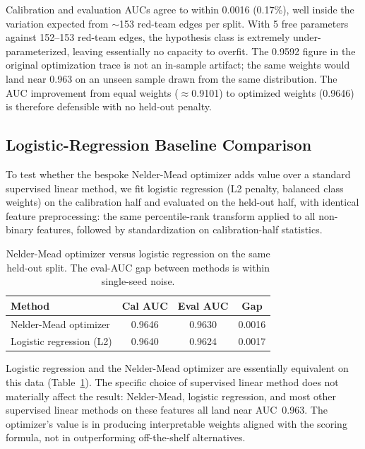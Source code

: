 Calibration and evaluation AUCs agree to within 0.0016 (0.17\%), well inside the variation expected from $\sim$153 red-team edges per split. With 5 free parameters against 152--153 red-team edges, the hypothesis class is extremely under-parameterized, leaving essentially no capacity to overfit. The 0.9592 figure in the original optimization trace is not an in-sample artifact; the same weights would land near 0.963 on an unseen sample drawn from the same distribution. The AUC improvement from equal weights ($\approx$0.9101) to optimized weights (0.9646) is therefore defensible with no held-out penalty.


\subsection{Logistic-Regression Baseline Comparison}
\label{sec:lr_baseline}

To test whether the bespoke Nelder-Mead optimizer adds value over a standard supervised linear method, we fit logistic regression (L2 penalty, balanced class weights) on the calibration half and evaluated on the held-out half, with identical feature preprocessing: the same percentile-rank transform applied to all non-binary features, followed by standardization on calibration-half statistics.

\begin{table}[h]
\centering
\begin{tabular}{lccc}
\hline
Method & Cal AUC & Eval AUC & Gap \\
\hline
Nelder-Mead optimizer   & 0.9646 & 0.9630 & 0.0016 \\
Logistic regression (L2) & 0.9640 & 0.9624 & 0.0017 \\
\hline
\end{tabular}
\caption{Nelder-Mead optimizer versus logistic regression on the same held-out split. The eval-AUC gap between methods is within single-seed noise.}
\label{tab:lr_comparison}
\end{table}

Logistic regression and the Nelder-Mead optimizer are essentially equivalent on this data (Table~\ref{tab:lr_comparison}). The specific choice of supervised linear method does not materially affect the result: Nelder-Mead, logistic regression, and most other supervised linear methods on these features all land near AUC~0.963. The optimizer's value is in producing interpretable weights aligned with the scoring formula, not in outperforming off-the-shelf alternatives.


